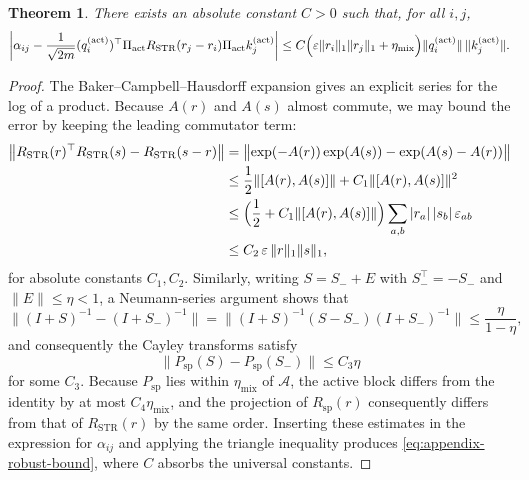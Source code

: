 \documentclass[11pt]{article}
\newtheorem{theorem}{Theorem}
\begin{document}
\begin{theorem}\label{thm:appendix-robust-logits}
There exists an absolute constant $C>0$ such that, for all $i,j$,
\begin{equation}
  \left|\alpha_{ij}
    - \frac{1}{\sqrt{2m}}
      (q_i^{(\mathrm{act})})^\top
      \Pi_{\mathrm{act}} R_{\mathrm{STR}}(r_j - r_i) \Pi_{\mathrm{act}}
      k_j^{(\mathrm{act})}\right|
  \le
  C\Bigl(\varepsilon \|r_i\|_1 \|r_j\|_1 + \eta_{\mathrm{mix}}\Bigr)
    \|q_i^{(\mathrm{act})}\|\,\|k_j^{(\mathrm{act})}\|.
  \label{eq:appendix-robust-bound}
\end{equation}
\end{theorem}

\begin{proof}
The Baker--Campbell--Hausdorff expansion gives an explicit series for the log of a product.  Because
$A(r)$ and $A(s)$ almost commute, we may bound the error by keeping the leading commutator term:
\begin{align}
  \bigl\|R_{\mathrm{STR}}(r)^\top R_{\mathrm{STR}}(s) - R_{\mathrm{STR}}(s-r)\bigr\|
  &= \bigl\|\exp(-A(r)) \exp(A(s)) - \exp(A(s)-A(r))\bigr\|\\
  &\le \frac{1}{2} \|[A(r),A(s)]\| + C_1 \|[A(r),A(s)]\|^2\\
  &\le \Bigl(\frac{1}{2} + C_1 \|[A(r),A(s)]\|\Bigr)
        \sum_{a,b} |r_a|\,|s_b|\,\varepsilon_{ab}\\
  &\le C_2\,\varepsilon\,\|r\|_1 \|s\|_1,
\end{align}
for absolute constants $C_1,C_2$.  Similarly, writing $S = S_- + E$ with $S_-^\top = -S_-$ and
$\|E\| \le \eta < 1$, a Neumann-series argument shows that
\begin{equation}
  \|(I+S)^{-1} - (I+S_-)^{-1}\|
  = \|(I+S)^{-1} (S - S_-) (I + S_-)^{-1}\|
  \le \frac{\eta}{1-\eta},
\end{equation}
and consequently the Cayley transforms satisfy
\begin{equation}
  \|P_{\mathrm{sp}}(S) - P_{\mathrm{sp}}(S_-)\| \le C_3 \eta
\end{equation}
for some $C_3$.  Because $P_{\mathrm{sp}}$ lies within $\eta_{\mathrm{mix}}$ of $\mathcal{A}$, the active block
differs from the identity by at most $C_4 \eta_{\mathrm{mix}}$, and the projection of
$R_{\mathrm{sp}}(r)$ consequently differs from that of $R_{\mathrm{STR}}(r)$ by the same order.  Inserting
these estimates in the expression for $\alpha_{ij}$ and applying the triangle inequality produces
\eqref{eq:appendix-robust-bound}, where $C$ absorbs the universal constants.
\end{proof}
\end{document}
